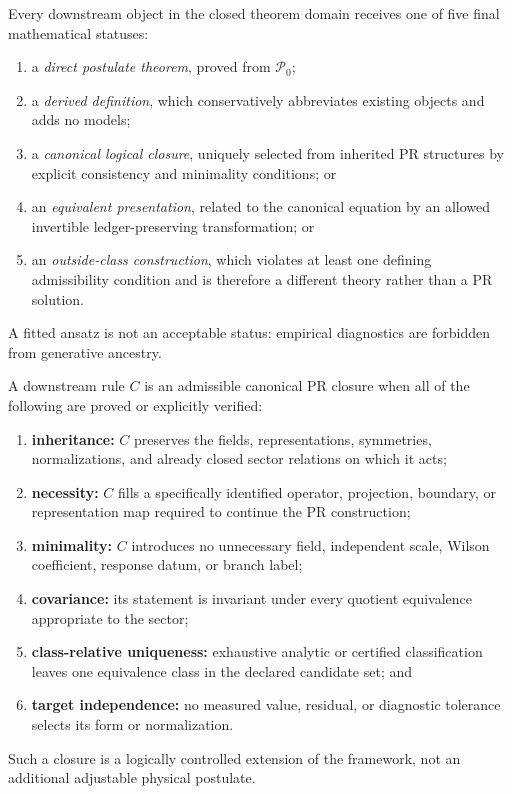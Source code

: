 Every downstream object in the closed theorem domain receives one of five
final mathematical statuses:
\begin{enumerate}
 \item a \emph{direct postulate theorem}, proved from $\mathcal P_0$;
 \item a \emph{derived definition}, which conservatively abbreviates existing
 objects and adds no models;
 \item a \emph{canonical logical closure}, uniquely selected from inherited PR
 structures by explicit consistency and minimality conditions; or
 \item an \emph{equivalent presentation}, related to the canonical equation by
 an allowed invertible ledger-preserving transformation; or
 \item an \emph{outside-class construction}, which violates at least one
 defining admissibility condition and is therefore a different theory rather
 than a PR solution.
\end{enumerate}
A fitted ansatz is not an acceptable status: empirical diagnostics are
forbidden from generative ancestry.

\begin{proposition}
\label{prop:pr35-canonical-closure-standard}
A downstream rule $C$ is an admissible canonical PR closure when all of the
following are proved or explicitly verified:
\begin{enumerate}
 \item \textbf{inheritance:} $C$ preserves the fields, representations,
 symmetries, normalizations, and already closed sector relations on which it
 acts;
 \item \textbf{necessity:} $C$ fills a specifically identified operator,
 projection, boundary, or representation map required to continue the PR
 construction;
 \item \textbf{minimality:} $C$ introduces no unnecessary field, independent
 scale, Wilson coefficient, response datum, or branch label;
 \item \textbf{covariance:} its statement is invariant under every quotient
 equivalence appropriate to the sector;
 \item \textbf{class-relative uniqueness:} exhaustive analytic or certified
 classification leaves one equivalence class in the declared candidate set;
 and
 \item \textbf{target independence:} no measured value, residual, or
 diagnostic tolerance selects its form or normalization.
\end{enumerate}
Such a closure is a logically controlled extension of the framework, not an
additional adjustable physical postulate.
\end{proposition}

